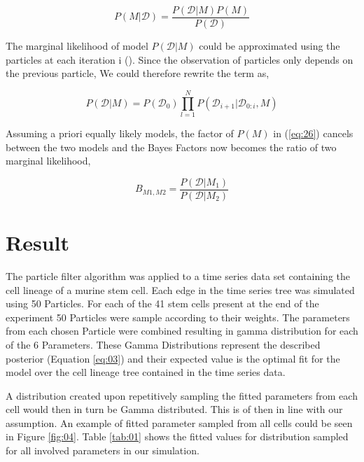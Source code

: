 \documentclass{bioinfo}
\begin{document}
\begin{equation}
P(M | \mathcal{D}) = \frac{P(\mathcal{D} | M) P(M)}{P(\mathcal{D})}\label{eq:27}
\end{equation}

The marginal likelihood of model $P(\mathcal{D} | M)$ could be approximated using the particles at each iteration i (\citealp{Wilkinson11}). Since the observation of particles only depends on the previous particle, We could therefore rewrite the term as,

\begin{equation}
P(\mathcal{D} | M) = P(\mathcal{D_0}) \prod_{l=1}^{N} P(\mathcal{D}_{i+1} | \mathcal{D}_{0:i}, M)\label{eq:28}
\end{equation}

Assuming a priori equally likely models, the factor of $P(M)$ in (\ref{eq:26}) cancels between the two models and the Bayes Factors now becomes the ratio of two marginal likelihood,

\begin{equation}
B_{M1, M2} = \frac{P(\mathcal{D} | M_1)}{P(\mathcal{D} | M_2)}\label{eq:29}
\end{equation}

\section{Result}

The particle filter algorithm was applied to a time series data set containing the cell lineage of a murine stem cell. Each edge in the time series tree was simulated using 50 Particles. For each of the 41 stem cells present at the end of the experiment 50 Particles were sample according to their weights. The parameters from each chosen Particle were combined resulting in gamma distribution for each of the 6 Parameters. These Gamma Distributions represent the described posterior (Equation \ref{eq:03}) and their expected value is the optimal fit for the model over the cell lineage tree contained in the time series data.

A distribution created upon repetitively sampling the fitted parameters from each cell would then in turn be Gamma distributed. This is of then in line with our assumption. An example of fitted parameter sampled from all cells could be seen in Figure \ref{fig:04}. Table \ref{tab:01} shows the fitted values for distribution sampled for all involved parameters in our simulation.
\end{document}
